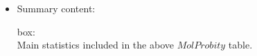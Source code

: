 \begin{itemize}
 \item Summary content:
 
   box:\\Main statistics included in the above $MolProbity$  table.

\end{itemize}
